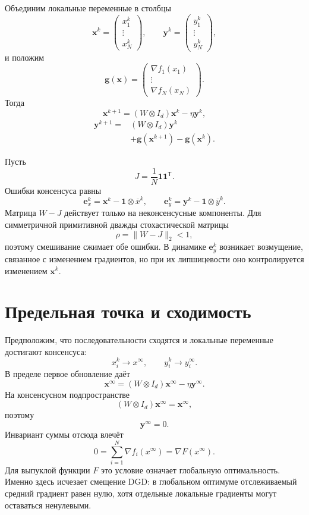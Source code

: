 Объединим локальные переменные в столбцы
\[
    \mathbf x^k
    =
    \begin{pmatrix}
        x_1^k\\
        \vdots\\
        x_N^k
    \end{pmatrix},
    \qquad
    \mathbf y^k
    =
    \begin{pmatrix}
        y_1^k\\
        \vdots\\
        y_N^k
    \end{pmatrix},
\]
и положим
\[
    \mathbf g(\mathbf x)
    =
    \begin{pmatrix}
        \nabla f_1(x_1)\\
        \vdots\\
        \nabla f_N(x_N)
    \end{pmatrix}.
\]
Тогда
\[
    \mathbf x^{k+1}
    =
    (W\otimes I_d)\mathbf x^k
    -\eta\mathbf y^k,
\]
\[
\begin{aligned}
    \mathbf y^{k+1}
    ={}&
    (W\otimes I_d)\mathbf y^k
    \\
    &+
    \mathbf g(\mathbf x^{k+1})
    -
    \mathbf g(\mathbf x^k).
\end{aligned}
\]

Пусть
\[
    J=\frac1N\mathbf1\mathbf1^{\mathsf T}.
\]
Ошибки консенсуса равны
\[
    \mathbf e_x^k
    =
    \mathbf x^k-
    \mathbf1\otimes\overline x^k,
    \qquad
    \mathbf e_y^k
    =
    \mathbf y^k-
    \mathbf1\otimes\overline y^k.
\]
Матрица \(W-J\) действует только на неконсенсусные компоненты. Для
симметричной примитивной дважды стохастической матрицы
\[
    \rho=\lVert W-J\rVert_2<1,
\]
поэтому смешивание сжимает обе ошибки. В динамике
\(\mathbf e_y^k\) возникает возмущение, связанное с изменением
градиентов, но при их липшицевости оно контролируется изменением
\(\mathbf x^k\).

\section{Предельная точка и сходимость}

Предположим, что последовательности сходятся и локальные переменные
достигают консенсуса:
\[
    x_i^k\to x^\infty,
    \qquad
    y_i^k\to y_i^\infty.
\]
В пределе первое обновление даёт
\[
    \mathbf x^\infty
    =
    (W\otimes I_d)\mathbf x^\infty
    -\eta\mathbf y^\infty.
\]
На консенсусном подпространстве
\[
    (W\otimes I_d)\mathbf x^\infty=\mathbf x^\infty,
\]
поэтому
\[
    \mathbf y^\infty=0.
\]
Инвариант суммы отсюда влечёт
\[
    0
    =
    \sum_{i=1}^{N}\nabla f_i(x^\infty)
    =
    \nabla F(x^\infty).
\]
Для выпуклой функции \(F\) это условие означает глобальную
оптимальность. Именно здесь исчезает смещение DGD: в глобальном
оптимуме отслеживаемый средний градиент равен нулю, хотя отдельные
локальные градиенты могут оставаться ненулевыми.


